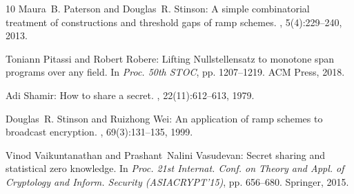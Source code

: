 \documentclass[11pt]{article}
\numberwithin{equation}{section}
\theoremstyle{definition}
\theoremstyle{plain}
\begin{document}
\begin{thebibliography}{10}
{\sc Maura~B. Paterson and Douglas~R. Stinson}: A simple combinatorial
  treatment of constructions and threshold gaps of ramp schemes.
, 5(4):229--240, 2013.
\newblock [\epfmtdoi{10.1007/s12095-013-0082-1}]

{\sc Toniann Pitassi and Robert Robere}: Lifting {N}ullstellensatz to monotone
  span programs over any field.
\newblock In {\em Proc. 50th STOC}, pp. 1207--1219. ACM Press, 2018.

{\sc Adi Shamir}: How to share a secret.
, 22(11):612--613, 1979.
\newblock [\epfmtdoi{10.1145/359168.359176}]

{\sc Douglas~R. Stinson and Ruizhong Wei}: An application of ramp schemes to
  broadcast encryption.
, 69(3):131--135, 1999.
\newblock [\epfmtdoi{10.1016/S0020-0190(98)00204-X}]

{\sc Vinod Vaikuntanathan and Prashant~Nalini Vasudevan}: Secret sharing and
  statistical zero knowledge.
\newblock In {\em Proc. 21st Internat. Conf. on Theory and Appl. of Cryptology
  and Inform. Security (ASIACRYPT'15)}, pp. 656--680. Springer, 2015.
\newblock [\epfmtdoi{10.1007/978-3-662-48797-6\_27}]

\end{thebibliography}
\end{document}
